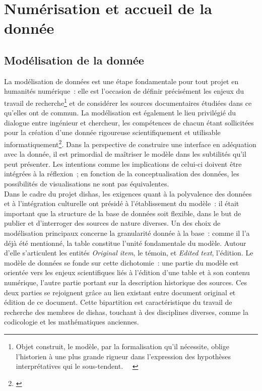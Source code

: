 \documentclass[a4paper,12pt,twoside]{book}
\newcommand{\clearemptydoublepage}{\newpage{\pagestyle{empty}\cleardoublepage}}
\newcommand{\eng}{\emph}
\newcommand{\Oi}{\eng{Original item}\xspace}
\newcommand{\g}[1]{\og#1~\fg}
\newcommand{\dishas}{\gls{dishas}\xspace}
\begin{document}
\clearemptydoublepage

\chapter{Numérisation et accueil de la donnée}
	\section{Modélisation de la donnée}
La modélisation de données est une étape fondamentale pour tout projet en humanités numérique~: elle est l'occasion de définir précisément les enjeux du travail de recherche\footnote{\g{Objet construit, le modèle, par la formalisation qu’il nécessite, oblige l’historien à une plus grande rigueur dans l’expression des hypothèses interprétatives qui le sous-tendent.}~ \cite[p.~25]{fargeGoutArchive1997}} et de considérer les sources documentaires étudiées dans ce qu'elles ont de commun. La modélisation est également le lieu privilégié du dialogue entre ingénieur et chercheur, les compétences de chacun étant sollicitées pour la création d'une donnée rigoureuse scientifiquement et utilisable informatiquement\footnote{\cite[§~17-18]{clavertHistorienProgrammeur2012}}. Dans la perspective de construire une interface en adéquation avec la donnée, il est primordial de maîtriser le modèle dans les subtilités qu'il peut présenter. Les intentions comme les implications de celui-ci doivent être intégrées à la réflexion~; en fonction de la conceptualisation des données, les possibilités de visualisations ne sont pas équivalentes.\\

Dans le cadre du projet \dishas, les exigences quant à la polyvalence des données et à l'intégration culturelle ont présidé à l'établissement du modèle~: il était important que la structure de la base de données soit flexible, dans le but de publier et d'interroger des sources de nature diverses. Un des choix de modélisation principaux concerne la granularité donnée à la base~: comme il l'a déjà été mentionné, la table constitue l'unité fondamentale du modèle. Autour d'elle s'articulent les entités \Oi, le témoin, et \eng{Edited text}, l'édition. Le modèle de données se fonde sur cette dichotomie~: une partie du modèle est orientée vers les enjeux scientifiques liés à l'édition d'une table et à son contenu numérique, l'autre partie portant sur la description historique des sources. Ces deux parties se rejoignent grâce au lien existant entre document original et édition de ce document. Cette bipartition est caractéristique du travail de recherche des membres de \dishas, touchant à des disciplines diverses, comme la codicologie et les mathématiques anciennes.
\end{document}
